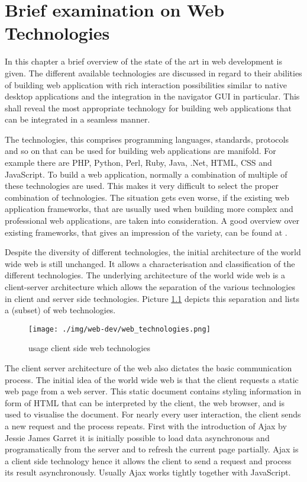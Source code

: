 \chapter{Brief examination on Web Technologies}\label{chap:web_dev}

In this chapter a brief overview of the state of the art in web development is given.
The different available technologies are discussed in regard to their abilities of building web application with rich interaction possibilities similar to native desktop applications and the integration in the navigator GUI in particular.
This shall reveal the most appropriate technology for building web applications that can be integrated in a seamless manner.

The technologies, this comprises programming languages, standards, protocols and so on that can be used for building web applications are manifold.
For example there are PHP, Python, Perl, Ruby, Java, .Net, HTML, CSS and JavaScript. 
To build a web application, normally a combination of multiple of these technologies are used.
This makes it very difficult to select the proper combination of technologies.
The situation gets even worse, if the existing web application frameworks, that are usually used when building more complex and professional web applications, are taken into consideration.
A good overview over existing frameworks, that gives an impression of the variety, can be found at \autocite{web-dev:list-frameworks}.

Despite the diversity of different technologies, the initial architecture of the world wide web is still unchanged.
It allows a characterisation and classification of the different technologies.
The underlying architecture of the world wide web is a client-server architecture which allows the separation of the various technologies in client and server side technologies.
Picture \ref{fig:web-technologies} depicts this separation and lists a (subset) of web technologies.

\begin{figure}
	\centering \texttt{[image: ./img/web-dev/web\_technologies.png]}
	\caption{usage client side web technologies}
	\label{fig:web-technologies}
\end{figure}

The client server architecture of the web also dictates the basic communication process.
The initial idea of the world wide web is that the client requests a static web page from a web server.
This static document contains styling information in form of HTML that can be interpreted by the client, the web browser, and is used to visualise the document.
For nearly every user interaction, the client sends a new request and the process repeats.
First with the introduction of Ajax by Jessie James Garret \autocite[]{ajax} it is initially possible to load data asynchronous and programatically from the server and to refresh the current page partially.
Ajax is a client side technology hence it allows the client to send a request and process its result asynchronously.
Usually Ajax works tightly together with JavaScript.

